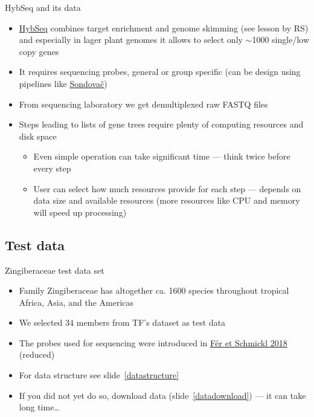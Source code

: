 \documentclass[compress, ucs, xelatex, 11pt, xcolor=x11names, aspectratio=169,
	hyperref={
		bookmarks=true,
		unicode=true,
		colorlinks=true,
		pdftitle={HybSeq course},
		plainpages=false,
		pdfauthor={Vojtech Zeisek},
		pdfsubject={Practical processing of HybSeq target enrichment sequencing data on computing grids like MetaCentrum},
		pdfcreator={XeLaTeX},
		pdfkeywords={BASH, command line, GNU, HybSeq, Linux, MetaCentrum, sequencing shell, target enrichment},
		linkcolor=Turquoise4, %
		anchorcolor=DodgerBlue4, %
		citecolor=DodgerBlue4, %
		filecolor=DodgerBlue4, %
		menucolor=Tan4, %
		urlcolor=DarkOliveGreen4, %
		pdftex},
	url={hyphens, lowtilde} %
	]{beamer}
\renewcommand{\texttt}[1]{\colorbox{Cornsilk2}{{\ttfamily #1}}}
\begin{document}
\begin{frame}{HybSeq and its data}
	\begin{itemize}
		\item \href{https://bsapubs.onlinelibrary.wiley.com/doi/full/10.3732/apps.1400042}{HybSeq} combines target enrichment and genome skimming (see lesson by RS) and especially in lager plant genomes it allows to select only $\sim$1000 single/low copy genes
		\item It requires sequencing probes, general or group specific (can be design using pipelines like \href{https://github.com/V-Z/sondovac/wiki}{Sondovač})
		\item From sequencing laboratory we get demultiplexed raw FASTQ files
		\item Steps leading to lists of gene trees require plenty of computing resources and disk space
		\begin{itemize}
			\item Even simple operation can take significant time --- think twice before every step
			\item User can select how much resources provide for each step --- depends on data size and available resources (more resources like CPU and memory will speed up processing)
		\end{itemize}
	\end{itemize}
\end{frame}

\subsection{Test data}

\begin{frame}{Zingiberaceae test data set}
	\begin{itemize}
		\item Family Zingiberaceae has altogether ca. 1600 species throughout tropical Africa, Asia, and the Americas
		\item We selected 34 members from TF's dataset as test data
		\item The probes used for sequencing were introduced in \href{https://journals.sagepub.com/doi/full/10.1177/1176934317742613}{Fér et Schmickl 2018} (reduced)
		\item For data structure see slide~\ref{datastructure}
		\item If you did not yet do so, download data (slide~\ref{datadownload}) --- it can take long time\ldots
	\end{itemize}
\end{frame}
\end{document}
